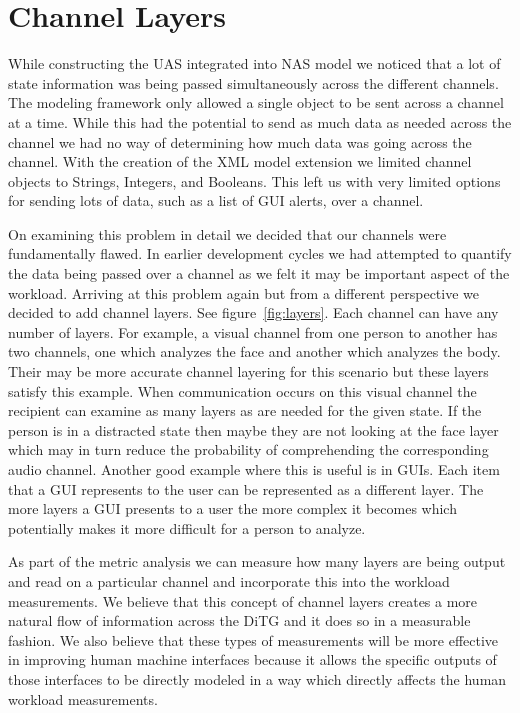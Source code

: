 \section{Channel Layers}

While constructing the UAS integrated into NAS model we noticed that a lot of state information was being passed simultaneously across the different channels.  The modeling framework only allowed a single object to be sent across a channel at a time.  While this had the potential to send as much data as needed across the channel we had no way of determining how much data was going across the channel.  With the creation of the XML model extension we limited channel objects to Strings, Integers, and Booleans.  This left us with very limited options for sending lots of data, such as a list of GUI alerts, over a channel.  

On examining this problem in detail we decided that our channels were fundamentally flawed.  In earlier development cycles we had attempted to quantify the data being passed over a channel as we felt it may be important aspect of the workload.  Arriving at this problem again but from a different perspective we decided to add channel layers. See figure~\ref{fig:layers}.  Each channel can have any number of layers.  For example, a visual channel from one person to another has two channels, one which analyzes the face and another which analyzes the body.  Their may be more accurate channel layering for this scenario but these layers satisfy this example.  When communication occurs on this visual channel the recipient can examine as many layers as are needed for the given state.  If the person is in a distracted state then maybe they are not looking at the face layer which may in turn reduce the probability of comprehending the corresponding audio channel.   Another good example where this is useful is in GUIs.  Each item that a GUI represents to the user can be represented as a different layer.  The more layers a GUI presents to a user the more complex it becomes which potentially makes it more difficult for a person to analyze.

As part of the metric analysis we can measure how many layers are being output and read on a particular channel and incorporate this into the workload measurements.  We believe that this concept of channel layers creates a more natural flow of information across the DiTG and it does so in a measurable fashion.  We also believe that these types of measurements will be more effective in improving human machine interfaces because it allows the specific outputs of those interfaces to be directly modeled in a way which directly affects the human workload measurements. 

